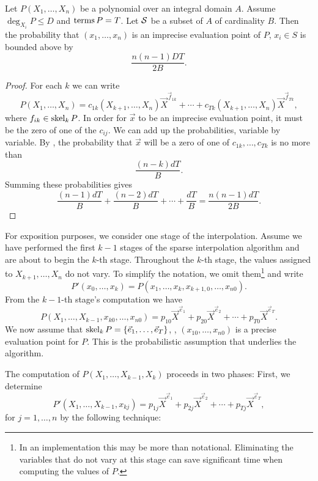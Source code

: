 \begin{proposition}\label{Imprecise:Prob:Prop}
Let $P(X_1, \ldots, X_n)$ be a polynomial over an integral domain $A$.
Assume $\deg_{X_i} P \le D$ and $\mathop{\rm terms}\nolimits P = T$.  Let ${\cal S}$ be a
subset of $A$ of cardinality $B$.  Then the probability that $(x_1,
\ldots, x_n)$ is an imprecise evaluation point of $P$, $x_i \in S$ is
bounded above by
\[
\frac{n(n-1)D T}{2B}.
\]
\end{proposition}

\begin{proof}
For each $k$ we can write
\[
P(X_1, \ldots, X_n) = c_{1k}(X_{k+1}, \ldots, X_n) \vec{X}^{\vec{f}_{1k}}
+ \cdots +
c_{Tk}(X_{k+1}, \ldots, X_n) \vec{X}^{\vec{f}_{Tk}},
\]
where $f_{ik} \in \mathop{\rm skel}\nolimits_k P$.  In order for $\vec{x}$ to be
an imprecise evaluation point, it must be the zero of one of the
$c_{ij}$.  We can add up the probabilities, variable by variable.  By
, the probability that $\vec{x}$ will be
a zero of one of $c_{1k}, \ldots, c_{Tk}$ is no more than
\[
\frac{(n-k)dT}{B}.
\]
Summing these probabilities gives
\[
\frac{(n-1)dT}{B} + \frac{(n-2)dT}{B} + \cdots + \frac{dT}{B} =
\frac{n(n-1)dT}{2B}.
\]
\end{proof}

\medskip

For exposition purposes, we consider one stage of the interpolation.
Assume we have performed the first $k-1$ stages of the sparse interpolation
algorithm and are about to begin the $k$-th stage.  Throughout the
$k$-th stage, the values assigned to $X_{k+1}, \ldots, X_{n}$ do
not vary.  To simplify the notation, we omit them\footnote{In an
implementation this may be more than notational.  Eliminating the
variables that do not vary at this stage can save significant time
when computing the values of $P$.} and write
\[
P'(x_0, \ldots, x_k) = P(x_1, \ldots, x_k, x_{k+1,0}, \ldots, x_{n0}).
\]
From the $k-1$-th stage's computation we have
\[
P(X_1, \ldots, X_{k-1}, x_{k0}, \ldots, x_{n0}) = p_{10} {\vec X}^{\vec e_1} +
p_{20} {\vec X}^{\vec e_2} + \cdots + p_{T0} {\vec X}^{\vec e_T}.
\]
We now assume that $\mathop{\rm skel}\nolimits_k P = \{\vec{e}_1, \ldots, \vec{e}_T\}$,
\ie, $(x_{10}, \ldots, x_{n0})$ is a precise evaluation point for $P$.
This is the probabilistic assumption that underlies the algorithm.

The computation of $P(X_1, \ldots, X_{k-1}, X_k)$ proceeds in two phases: 
First, we determine  
\[
P'(X_1, \ldots, X_{k-1}, x_{kj}) = 
p_{1j} {\vec X}^{\vec e_1} + p_{2j} {\vec X}^{\vec e_2} + \cdots + p_{Tj} {\vec
X}^{\vec e_T},
\]
for $j = 1, \ldots, n$ by the following technique:

